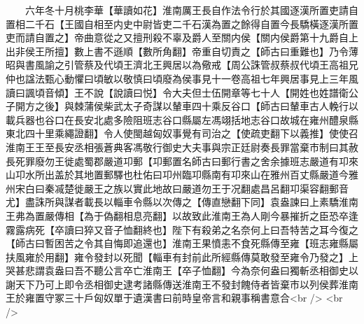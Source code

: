 　　六年冬十月桃李華【華讀如花】淮南厲王長自作法令行於其國逐漢所置吏請自置相二千石【王國自相至内史中尉皆吏二千石漢為置之餘得自置今長驕橫逐漢所置吏而請自置之】帝曲意從之又擅刑殺不辜及爵人至關内侯【關内侯爵第十九爵自上出非侯王所擅】數上書不遜順【數所角翻】帝重自切責之【師古曰重難也】乃令薄昭與書風諭之引管蔡及代頃王濟北王興居以為儆戒【周公誅管叔蔡叔代頃王高祖兄仲也諡法甄心動懼曰頃敏以敬慎曰頃廢為侯事見十一卷高祖七年興居事見上三年風讀曰諷頃音傾】王不說【說讀曰悦】令大夫但士伍開章等七十人【開姓也姓譜衛公子開方之後】與棘蒲侯柴武太子奇謀以輦車四十乘反谷口【師古曰輦車古人輓行以載兵器也谷口在長安北處多險阻班志谷口縣屬左馮翊括地志谷口故城在雍州醴泉縣東北四十里乘繩證翻】令人使閩越匈奴事覺有司治之【使疏吏翻下以義推】使使召淮南王王至長安丞相張蒼典客馮敬行御史大夫事與宗正廷尉奏長罪當棄市制曰其赦長死罪廢勿王徙處蜀郡嚴道卭郵【卭郵置名師古曰郵行書之舍余據班志嚴道有卭來山卭水所出盖於其地置郵驛也杜佑曰卭州臨卭縣南有卭來山在雅州百丈縣嚴道今雅州宋白曰秦㓕楚徙嚴王之族以實此地故曰嚴道勿王于况翻處昌呂翻卭渠容翻郵音尤】盡誅所與謀者載長以輜車令縣以次傳之【傳直戀翻下同】袁盎諫曰上素驕淮南王弗為置嚴傳相【為于偽翻相息亮翻】以故致此淮南王為人剛今暴摧折之臣恐卒逢霧露病死【卒讀曰猝又音子恤翻終也】陛下有殺弟之名奈何上曰吾特苦之耳今復之【師古曰暫困苦之令其自悔即追還也】淮南王果憤恚不食死縣傳至雍【班志雍縣屬扶風雍於用翻】雍令發封以死聞【輜車有封前此所經縣傳莫敢發至雍令乃發之】上哭甚悲謂袁盎曰吾不聽公言卒亡淮南王【卒子恤翻】今為奈何盎曰獨斬丞相御史以謝天下乃可上即令丞相御史逮考諸縣傳送淮南王不發封餽侍者皆棄市以列侯葬淮南王於雍置守冢三十戶匈奴單于遺漢書曰前時皇帝言和親事稱書意合<br />
<br />
